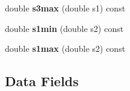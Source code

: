 \begin{DoxyCompactItemize}
\item 
\hypertarget{class_d_p_kinematics_a8439d9aea1c55ad34301164198374b51}{double {\bfseries s3max} (double s1) const }\label{class_d_p_kinematics_a8439d9aea1c55ad34301164198374b51}

\item 
\hypertarget{class_d_p_kinematics_afc1ed81c32ec12fc803089c2aeee12d4}{double {\bfseries s1min} (double s2) const }\label{class_d_p_kinematics_afc1ed81c32ec12fc803089c2aeee12d4}

\item 
\hypertarget{class_d_p_kinematics_a516436bcf6f9236607dbf83e4c21f283}{double {\bfseries s1max} (double s2) const }\label{class_d_p_kinematics_a516436bcf6f9236607dbf83e4c21f283}

\end{DoxyCompactItemize}
\subsection*{Data Fields}
